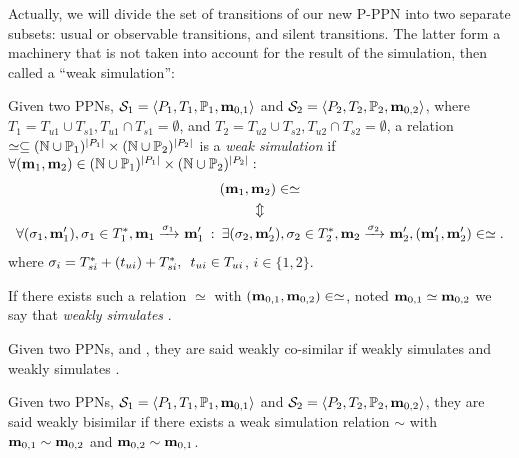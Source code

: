 Actually, we will divide the set of transitions of our new P-PPN into two separate subsets: usual or observable transitions, and silent transitions.
The latter form a machinery that is not taken into account for the result of the simulation, then called a ``weak simulation'':
\begin{defi}
  Given two \acp{PPN}, $\defPPN[1]$ and $\defPPN[2]$,
  where $T_1 = T_{u1} \cup T_{s1}, T_{u1} \cap T_{s1} = \emptyset$,
  and   $T_2 = T_{u2} \cup T_{s2}, T_{u2} \cap T_{s2} = \emptyset$,
  a relation $\simeq \subseteq (\mathbb{N} \cup  \mathbb{P}_1)^{\left|P_1\right|} \times (\mathbb{N} \cup  \mathbb{P}_2)^{\left|P_2\right|}$ is a \emph{weak simulation} if $\forall (\mathbf{m}_1, \mathbf{m}_2) \in (\mathbb{N} \cup  \mathbb{P}_1)^{\left|P_1\right|} \times (\mathbb{N} \cup  \mathbb{P}_2)^{\left|P_2\right|} : $
  \begin{gather*}
    (\mar_1, \mar_2) \in \simeq \\
    \Updownarrow\\
    \forall (\seqt_1,\mar'_1), \seqt_1 \in \transitions_1^*, \mar_1 \fire{\seqt_1} \mar'_1 \>:\>
    \exists (\seqt_2,\mar'_2), \seqt_2 \in \transitions_2^*, \mar_2 \fire{\seqt_2} \mar'_2, (\mar'_1, \mar'_2) \in \simeq.
  \end{gather*}
  where $\seqt_i = \transitions_{si}^* + (t_{ui}) + \transitions_{si}^*,\enspace t_{ui} \in \transitions_{ui}$, $i \in \{1, 2\}$.%

  If there exists such a relation $\simeq$ with $(\mathbf{m}_{0,1}, \mathbf{m}_{0,2}) \in \simeq$, noted $\mathbf{m}_{0,1} \simeq \mathbf{m}_{0,2}$ we say that \namePPN[2] \emph{weakly simulates} \namePPN[1].
\end{defi}

\begin{defi}
  Given two \acp{PPN}, \namePPN[1] and \namePPN[2],
  they are said weakly co-similar if \namePPN[1] weakly simulates \namePPN[2] and \namePPN[2] weakly simulates \namePPN[1].
\end{defi}

\begin{defi}
  Given two \acp{PPN}, $\defPPN[1]$ and $\defPPN[2]$,
  they are said weakly bisimilar if there exists a weak simulation relation $\sim$ with $\mathbf{m}_{0,1} \sim \mathbf{m}_{0,2}$ and $\mathbf{m}_{0,2} \sim \mathbf{m}_{0,1}$.
\end{defi}

